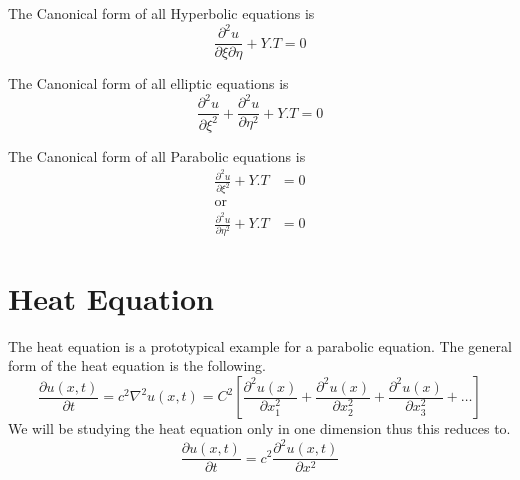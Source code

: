 \begin{observation}
    The Canonical form of all Hyperbolic equations is 
    \[
        \frac{\partial^2 u}{\partial\xi\partial\eta} +Y.T = 0
    \]
\end{observation}
\begin{observation}
    The Canonical form of all elliptic equations is 
    \[
        \frac{\partial^2 u}{\partial\xi^2}+\frac{\partial^2 u}{\partial\eta^2}+Y.T =0
    \]
\end{observation}
\begin{observation}
    The Canonical form of all Parabolic equations is 
    \begin{align*}
        \frac{\partial^2 u}{\partial\xi^2}+Y.T &=0
        \\
        \text{or}
        \\
        \frac{\partial^2 u}{\partial\eta^2}+Y.T &=0
    \end{align*}
\end{observation}

\newpage
\section{Heat Equation}
The heat equation is a prototypical example for a parabolic equation. The general form of the heat equation is the following.
\[
    \frac{\partial u(x,t)}{\partial t} = c^2\nabla^2 u(x,t) = C^2\left[\frac{\partial^2 u(x)}{\partial x^{2}_{1}} + \frac{\partial^2 u(x)}{\partial x^{2}_{2}} + \frac{\partial^2 u(x)}{\partial x^{2}_{3}} + \dots\right]    
\]
We will be studying the heat equation only in one dimension thus this reduces to.
\[
    \frac{\partial u(x,t)}{\partial t} = c^2 \frac{\partial^2 u(x,t)}{\partial x^2}     
\]
